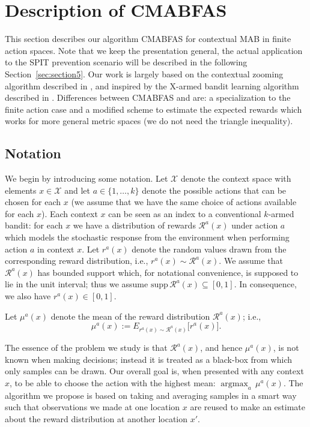 \documentclass{llncs}
\newcommand{\argmax}{\mathop{\mathrm{argmax}}}
\begin{document}
\section{Description of CMABFAS}
This section describes
our algorithm CMABFAS for contextual MAB in finite action spaces.
Note that we keep the presentation general, the actual application 
to the SPIT prevention scenario will be described in the following
Section~\ref{sec:section5}. Our work is largely based on the contextual 
zooming algorithm described in \cite{DBLP:journals/corr/abs-0907-3986},
and inspired by the X-armed bandit learning algorithm described in \cite{Xarmed_bubeck}. 
Differences between CMABFAS and \cite{DBLP:journals/corr/abs-0907-3986} are: a specialization to 
the finite action case and a modified scheme to estimate the expected rewards which works for
more general metric spaces (we do not need the triangle inequality). 

\subsection{Notation} 
We begin by introducing some notation. Let $\mathcal X$ denote the context space 
with elements $x \in \mathcal X$ and let $a \in \{1,\ldots,k\}$ denote the possible
actions that can be chosen for each $x$ (we assume that we have the same choice of 
actions available for each $x$). Each context $x$ can be seen as an index to a conventional $k$-armed bandit: 
for each $x$ we have a distribution of rewards $\mathcal R^a(x)$ under action
$a$ which models the stochastic response from the environment when performing
action $a$ in context $x$. Let $r^a(x)$ denote the random values drawn from the
corresponding reward distribution, i.e., $r^a(x)\sim \mathcal R^a(x)$. We assume that
$\mathcal R^a(x)$ has bounded support which, for notational convenience, is 
supposed to lie in the unit interval; thus we assume 
$\mathrm{supp} \, \mathcal R^a(x) \subseteq [0,1]$. In consequence, we also have
$r^a(x) \in [0,1]$. 

Let $\mu^a(x)$ denote the mean of the reward distribution $\mathcal R^a(x)$; i.e.,
\begin{equation}
\mu^a(x):= E_{r^a(x)\sim \mathcal R^a(x)} \bigl[r^a(x)\bigr]. 
\end{equation}

The essence of the problem we study is that $\mathcal R^a(x)$, and hence
$\mu^a(x)$, is not known when making decisions; instead it is treated as a
black-box from which only samples can be drawn. Our overall goal is, when 
presented with any context $x$, to be able to choose the action with the 
highest mean: $\argmax_a \, \mu^a(x)$. The algorithm we propose is 
based on taking and averaging samples in a smart way such that observations
we made at one location $x$ are reused to make an estimate about the
reward distribution at another location $x'$.
\end{document}
